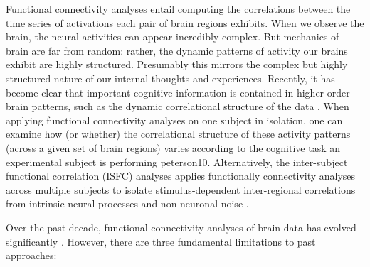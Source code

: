 \documentclass[12pt]{article}
\begin{document}
Functional connectivity analyses entail computing the correlations between the time series of activations each pair of brain regions exhibits. When we observe the brain, the neural activities can appear incredibly complex. But mechanics of brain are far from random: rather, the dynamic patterns of activity our brains exhibit are highly structured. Presumably this mirrors the complex but highly structured nature of our internal thoughts and experiences. Recently, it has become clear that important cognitive information is contained in higher-order brain patterns, such as the dynamic correlational structure of the data \cite{davidson2016}. When applying functional connectivity analyses on one subject in isolation, one can examine how (or whether) the correlational structure of these activity patterns (across a given set of brain regions) varies according to the cognitive task an experimental subject is performing \cite{Turke13}\cite{Rubinov2010}{peterson10}. Alternatively, the inter-subject functional correlation (ISFC) analyses applies functionally connectivity analyses across multiple subjects to isolate stimulus-dependent inter-regional correlations from intrinsic neural processes and non-neuronal noise \cite{hasson2016}\cite{jeremy2017}.

Over the past decade, functional connectivity analyses of brain data has evolved significantly \cite{olaf2005}\cite{khambhati2017}. However, there are three fundamental limitations to past approaches:
\end{document}
